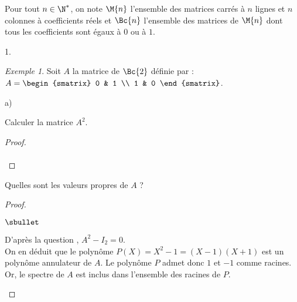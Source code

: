 \documentclass[11pt]{article}%
\begin{document}
\noindent
Pour tout $n\in\N^*$, on note $\M{n}$ l'ensemble des matrices carrés à
$n$ lignes et $n$ colonnes à coefficients réels et $\Bc{n}$ l'ensemble
des matrices de $\M{n}$ dont tous les coefficients sont égaux à $0$ ou
à $1$.
\begin{noliste}{1.}
  \setlength{\itemsep}{4mm}
\item {\it Exemple 1}. Soit $A$ la matrice de $\Bc{2}$ définie par :
  $A = 
  \begin{smatrix} 
    0 & 1 \\ 
    1 & 0
  \end{smatrix}$.
  \begin{noliste}{a)}
    \setlength{\itemsep}{2mm}
  \item Calculer la matrice $A^2$.
    
    \begin{proof}~\\[-.6cm]%
      ~\\[-1cm]
    \end{proof}
    
  \item Quelles sont les valeurs propres de $A$ ?
	
    \begin{proof}~
      \begin{noliste}{$\sbullet$}
      \item D'après la question , $A^2 - I_2 = 0$.\\
        On en déduit que le polynôme $P(X) = X^2-1 = (X-1)(X+1)$ est
        un polynôme annulateur de $A$. Le polynôme $P$ admet donc $1$
        et $-1$ comme racines.\\
        Or, le spectre de $A$ est inclus dans l'ensemble des racines
        de $P$. %


\end{noliste}
\end{proof}
\end{noliste}
\end{noliste}
\end{document}

